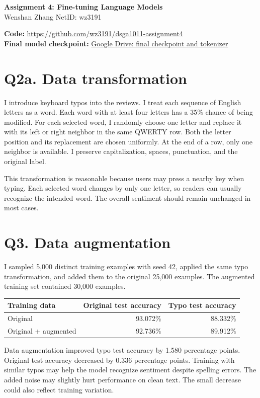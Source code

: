 \documentclass[11pt]{article}
\begin{document}
\begin{center}{\Large\bfseries Assignment 4: Fine-tuning Language Models}\\[5pt]
Wenshan Zhang \quad NetID: wz3191
\end{center}
\textbf{Code:} \url{https://github.com/wz3191/dsga1011-assignment4}\\
\textbf{Final model checkpoint:} \href{https://drive.google.com/drive/folders/1FjvmzQhq-PaMB6C09AFjqRof1zkbUR1v}{Google Drive: final checkpoint and tokenizer}

\section{Q2a. Data transformation}
I introduce keyboard typos into the reviews. I treat each sequence of English letters as a word. Each word with at least four letters has a 35\% chance of being modified. For each selected word, I randomly choose one letter and replace it with its left or right neighbor in the same QWERTY row. Both the letter position and its replacement are chosen uniformly. At the end of a row, only one neighbor is available. I preserve capitalization, spaces, punctuation, and the original label.

This transformation is reasonable because users may press a nearby key when typing. Each selected word changes by only one letter, so readers can usually recognize the intended word. The overall sentiment should remain unchanged in most cases.

\section{Q3. Data augmentation}
I sampled 5,000 distinct training examples with seed 42, applied the same typo transformation, and added them to the original 25,000 examples. The augmented training set contained 30,000 examples.

\begin{center}
\begin{tabular}{lrr}\toprule
Training data & Original test accuracy & Typo test accuracy\\\midrule
Original & 93.072\% & 88.332\%\\
Original + augmented & 92.736\% & 89.912\%\\\bottomrule
\end{tabular}
\end{center}
Data augmentation improved typo test accuracy by 1.580 percentage points. Original test accuracy decreased by 0.336 percentage points. Training with similar typos may help the model recognize sentiment despite spelling errors. The added noise may slightly hurt performance on clean text. The small decrease could also reflect training variation.
\end{document}
